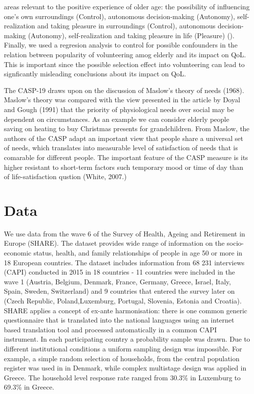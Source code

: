 \documentclass[10pt, letterpaper]{article}
\begin{document}
\begin{spacing}{1.4}
areas relevant to the positive experience of older age: the possibility of influencing one's own  surroundings (Control), autonomous decision-making (Autonomy), self-realization and taking pleasure in	surroundings (Control), autonomous decision-making (Autonomy), self-realization and taking pleasure in  life (Pleasure) (\cite{hyde03}). Finally, we used a regresion analysis to control for possible confounders in the relation between popularity of volunteering amog elderly and its impact on QoL. This is important since the possible selection effect into volunteering can lead to signficantly misleading conclusions about its impact on QoL. 


  The CASP-19 draws upon on the discussion of Maslow's theory of needs (1968)\citep{borrat15}. Maslow's theory was compared with the view presented in the article by Doyal and Gough
(1991) that the priority of physiological needs over social may be dependent on circumstances.  As an example we can consider elderly people saving on heating to buy Christmas presents for grandchildren. From Maslow, the authors of the CASP adapt an important view that people share a universal set of needs, which translates into measurable level of satisfaction of needs that is comarable for different people. The important feature of the CASP measure is its higher resistant to short-term factors such temporary mood or time of day than of life-satisfaction qustion (White, 2007.) \\




\section{Data}

We use data from the wave 6 of the Survey of Health, Ageing and Retirement in Europe (SHARE). The dataset provides wide range of information on the socio-economic status, health, and family relationships of people in age 50 or more in 18 European countries. The dataset includes information from 68 231 interviews (CAPI) conducted in 2015 in 18 countries - 11 countries were included in the wave 1 (Austria, Belgium, Denmark, France, Germany, Greece, Israel, Italy, Spain, Sweden, Switzerland) and 9 countries that entered the survey later on (Czech Republic, Poland,Luxemburg,  Portugal, Slovenia, Estonia and Croatia). SHARE applies a concept of ex-ante harmonisation: there is one common generic questionnaire that is translated into the national languages using an internet based translation tool and processed automatically in a common CAPI instrument. In each participating country a probability sample was drawn. Due to different institutional conditions a uniform sampling design was impossible. For example, a simple random selection of households, from the central population register was used in in Denmark, while complex multistage design was applied in Greece. The  household level response rate ranged from 30.3\% in Luxemburg to 69.3\% in Greece. \citet{bergmann17} \\


\end{spacing}
\end{document}
